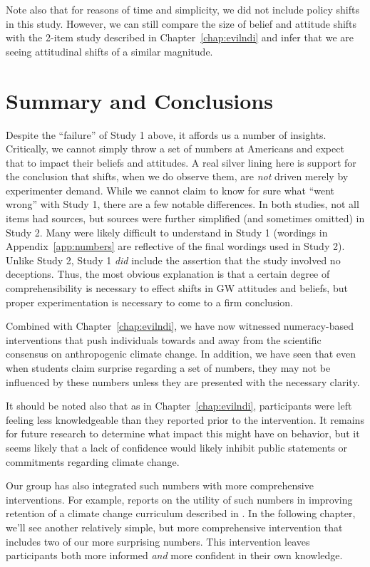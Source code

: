 Note also that for reasons of time and simplicity, we did not include policy
shifts in this study. However, we can still compare the size of belief and
attitude shifts with the 2-item study described in Chapter~\ref{chap:evilndi}
and infer that we are seeing attitudinal shifts of a similar magnitude.

\section{Summary and Conclusions}

Despite the “failure” of Study 1 above, it affords us a number of insights.
Critically, we cannot simply throw a set of numbers at Americans and expect that
to impact their beliefs and attitudes. A real silver lining here is support for
the conclusion that shifts, when we do observe them, are \emph{not} driven
merely by experimenter demand. While we cannot claim to know for sure what “went
wrong” with Study 1, there are a few notable differences.  In both studies, not
all items had sources, but sources were further simplified (and sometimes
omitted) in Study 2. Many were likely difficult to understand in Study 1
(wordings in Appendix~\ref{app:numbers} are reflective of the final wordings
used in Study 2). Unlike Study 2, Study 1 \emph{did} include the assertion that
the study involved no deceptions. Thus, the most obvious explanation is that a
certain degree of comprehensibility is necessary to effect shifts in GW
attitudes and beliefs, but proper experimentation is necessary to come to a firm
conclusion.

Combined with Chapter~\ref{chap:evilndi}, we have now witnessed numeracy-based
interventions that push individuals towards and away from the scientific
consensus on anthropogenic climate change. In addition, we have seen that even
when students claim surprise regarding a set of numbers, they may not be
influenced by these numbers unless they are presented with the necessary clarity.

It should be noted also that as in Chapter~\ref{chap:evilndi}, participants were
left feeling less knowledgeable than they reported prior to the intervention. It
remains for future research to determine what impact this might have on
behavior, but it seems likely that a lack of confidence would likely
inhibit public statements or commitments regarding climate change.

Our group has also integrated such numbers with  more comprehensive
interventions. For example, \textcite{clark_knowledge_inpress} reports on the
utility of such numbers in improving retention of a climate change curriculum
described in \textcite{felipe_numerical_2012}. In the following chapter, we'll
see another relatively simple, but more comprehensive intervention that includes two
of our more surprising numbers. This intervention leaves participants both more informed
\emph{and} more confident in their own knowledge.

